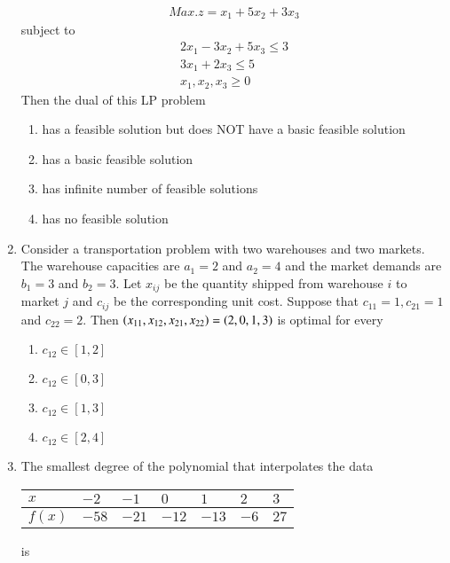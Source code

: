 \documentclass[journal]{IEEEtran}
\begin{document}
\begin{enumerate}
		\begin{align*}
		Max. z=x_{1}+5 x_{2}+3 x_{3}
		\end{align*}
subject to
             \begin{align*}
 2 x_{1}-3 x_{2}+5 x_{3} \leq 3 \\
 3 x_{1}+2 x_{3} \leq 5 \\
 x_{1}, x_{2}, x_{3} \geq 0
             \end{align*}
	 Then the dual of this LP problem
		\begin{enumerate}
			\item has a feasible solution but does NOT have a basic feasible solution
			\item has a basic feasible solution
			\item has infinite number of feasible solutions
			\item has no feasible solution
        	\end{enumerate}
	\item Consider a transportation problem with two warehouses and two markets. The warehouse capacities are $a_{1}=2$ and $a_{2}=4$ and the market demands are $b_{1}=3$ and $b_{2}=3$. Let $x_{i j}$ be the quantity shipped from warehouse $i$ to market $j$ and $c_{i j}$ be the corresponding unit cost. Suppose that $c_{11}=1, c_{21}=1$ and $c_{22}=2$. Then $\left(x_{11}, x_{12}, x_{21}, x_{22}\right)=(2,0,1,3)$ is optimal for every
		\begin{enumerate}
			\item $c_{12} \in[1,2]$
			\item $c_{12} \in[0,3]$
	         	\item $c_{12} \in[1,3]$
                 	\item $c_{12} \in[2,4]$
	\end{enumerate}	
    \item The smallest degree of the polynomial that interpolates the data
     \begin{tabular}{|l|l|l|l|l|l|l|}
     \hline$x$ & $-2$ & $-1$ & $0$ & $1$ & $2$ & $3$ \\
     \hline$f(x)$ & $-58$ & $-21$ & $-12$ & $-13$ & $-6$ &$ 27$ \\
     \hline
\end{tabular}
is
      \begin{enumerate}
\end{enumerate}
\end{enumerate}
\end{document}
